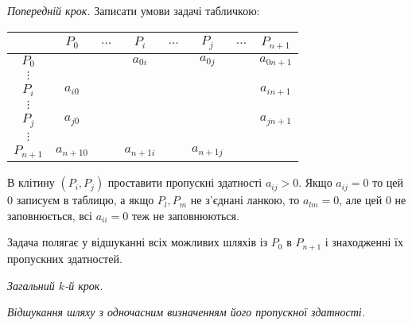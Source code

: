 \documentclass[12pt,a4paper]{report}
\newenvironment{slim_enumerate}{
\begin{enumerate}
  \setlength{\itemsep}{1pt}
  \setlength{\parskip}{0pt}
  \setlength{\parsep}{0pt}}
{\end{enumerate}}
\begin{document}
\begin{slim_enumerate}
  \item {\it Попередній крок.} Записати умови задачі табличкою:\\
\begin{tabular}{ | c | c | c | c | c | c | c | c | }
\hline
	&	$P_0$	&	$\dots$	&	$P_i$	&	$\dots$	&	$P_j$	&	$\dots$	&	$P_{n+1}$\\
\hline
$P_0	$&		&		&	$a_{0 i}$	&		&	$a_{0 j}$	&		&	$a_{0 n+1}$\\
\hline
$\vdots$	&		&		&		&		&		&		&\\
\hline
$P_i$	&	$a_{i 0}$	&		&		&		&		&		& $a_{i n+1}$\\
\hline
$\vdots$	&		&		&		&		&		&		&\\
\hline
$P_j$	&	$a_{j 0}$	&		&		&		&		&		& $a_{j n+1}$\\
\hline
$\vdots$	&		&		&		&		&		&		&\\
\hline
$P_{n+1}$	&	$a_{n+1 0}$	&		&	$a_{n+1 i}$	&		&	$a_{n+1 j}$	&		&\\
\hline
\end{tabular}

В клітину $(P_i, P_j)$ проставити пропускні здатності $a_{ij}>0$. Якщо $a_{ij}=0$ то цей 0 записуєм в таблицю, а якщо $P_l, P_m$ не з’єднані ланкою, то $a_{l m} = 0$, але цей 0 не заповнюється, всі $a_{ii}=0$ теж не заповнюються.

Задача полягає у відшуканні всіх можливих шляхів із $P_0$ в $P_{n+1}$ і знаходженні їх пропускних здатностей.

  \item {\it Загальний $k$-й крок.}
  \begin{slim_enumerate}
    \item {\it Відшукання шляху з одночасним визначенням його пропускної здатності.}


\end{slim_enumerate}
\end{slim_enumerate}
\end{document}
